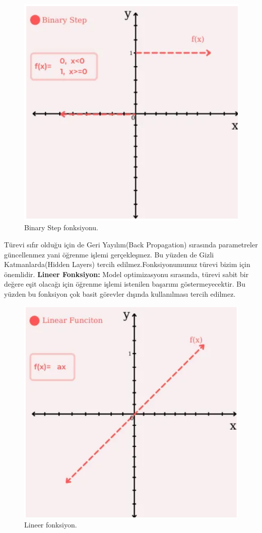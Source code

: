 \documentclass[12pt, a4paper]{article}
\begin{document}
	\begin{figure}[!h]
		\centering
		\includegraphics{6.1.png}
		\caption{Binary Step fonksiyonu.}
	\end{figure}
	\newline Türevi sıfır olduğu için de Geri Yayılım(Back Propagation) sırasında parametreler güncellenmez yani öğrenme işlemi gerçekleşmez. Bu yüzden de Gizli Katmanlarda(Hidden Layers) tercih edilmez.Fonksiyonumunuz türevi bizim için önemlidir.
	\newline \textbf{Lineer Fonksiyon:} Model optimizasyonu sırasında, türevi sabit bir değere eşit olacağı için öğrenme işlemi istenilen başarımı göstermeyecektir. Bu yüzden bu fonksiyon çok basit görevler dışında kullanılması tercih edilmez.	
	\begin{figure}[!h]
		\centering
		\includegraphics{6.2.png}
		\caption{Lineer fonksiyon.}
	\end{figure}
\end{document}
